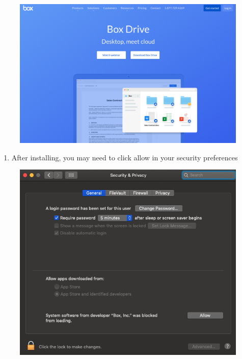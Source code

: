 \documentclass[]{book}
\providecommand{\tightlist}{%
  \setlength{\itemsep}{0pt}\setlength{\parskip}{0pt}}
\begin{document}
\begin{figure}
\centering
\includegraphics{images/lab_protocols/box/1.png}
\caption{}
\end{figure}

\begin{enumerate}
\def\labelenumi{\arabic{enumi}.}
\setcounter{enumi}{1}
\tightlist
\item
  After installing, you may need to click allow in your security preferences
\end{enumerate}

\begin{figure}
\centering
\includegraphics{images/lab_protocols/box/2.png}
\caption{}
\end{figure}
\end{document}
